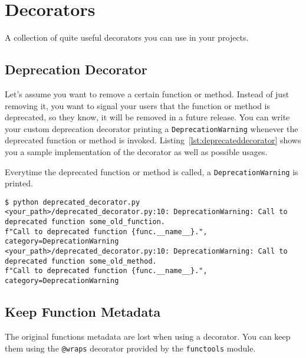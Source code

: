 
\section{Decorators}

A collection of quite useful decorators you can use in your projects.


\subsection{Deprecation Decorator}

Let's assume you want to remove a certain function or method.
Instead of just removing it, you want to signal your users that the function or method is deprecated, so they know, it will be removed in a future release.
You can write your custom deprecation decorator printing a \lstinline{DeprecationWarning} whenever the deprecated function or method is invoked.
Listing~\ref{lst:deprecateddecorator} shows you a sample implementation of the decorator as well as possible usages.



Everytime the deprecated function or method is called, a \lstinline{DeprecationWarning} is printed.

\begin{lstlisting}[caption=Output of deprecated\_decorator.py]
$ python deprecated_decorator.py
<your_path>/deprecated_decorator.py:10: DeprecationWarning: Call to deprecated function some_old_function.
f"Call to deprecated function {func.__name__}.", category=DeprecationWarning
<your_path>/deprecated_decorator.py:10: DeprecationWarning: Call to deprecated function some_old_method.
f"Call to deprecated function {func.__name__}.", category=DeprecationWarning
\end{lstlisting}


\subsection{Keep Function Metadata}

The original functions metadata are lost when using a decorator.
You can keep them using the \lstinline{@wraps} decorator provided by the \lstinline{functools} module.




